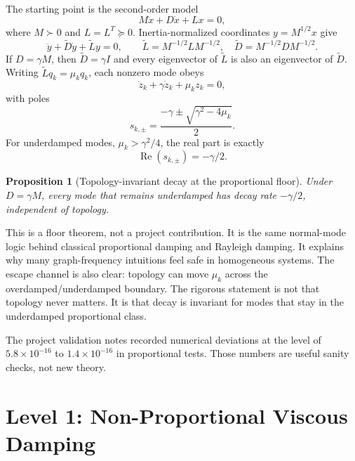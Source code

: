 \documentclass[11pt]{article}
\newcommand{\Real}{\operatorname{Re}}
\newcommand{\Lt}{\widetilde L}
\newcommand{\Dt}{\widetilde D}
\newtheorem{proposition}{Proposition}
\begin{document}
The starting point is the second-order model
\begin{equation}
  M\ddot x+D\dot x+Lx=0,
  \label{eq:level0-second-order}
\end{equation}
where $M\succ0$ and $L=L^T\succeq0$. Inertia-normalized coordinates
$y=M^{1/2}x$ give
\begin{equation}
  \ddot y+\Dt\dot y+\Lt y=0,\qquad
  \Lt=M^{-1/2}LM^{-1/2},\quad
  \Dt=M^{-1/2}DM^{-1/2}.
  \label{eq:normalized-coords}
\end{equation}
If $D=\gamma M$, then $\Dt=\gamma I$ and every eigenvector of $\Lt$ is also
an eigenvector of $\Dt$. Writing $\Lt q_k=\mu_kq_k$, each nonzero mode obeys
\begin{equation}
  \ddot z_k+\gamma\dot z_k+\mu_k z_k=0,
  \label{eq:level0-scalar}
\end{equation}
with poles
\begin{equation}
  s_{k,\pm}=\frac{-\gamma\pm\sqrt{\gamma^2-4\mu_k}}{2}.
  \label{eq:level0-poles}
\end{equation}
For underdamped modes, $\mu_k>\gamma^2/4$, the real part is exactly
\begin{equation}
  \Real(s_{k,\pm})=-\gamma/2.
  \label{eq:rigid-decay}
\end{equation}

\begin{proposition}[Topology-invariant decay at the proportional floor]
Under $D=\gamma M$, every mode that remains underdamped has decay rate
$-\gamma/2$, independent of topology.
\end{proposition}

\noindent This is a floor theorem, not a project contribution. It is the same
normal-mode logic behind classical proportional damping and Rayleigh damping.
It explains why many graph-frequency intuitions feel safe in homogeneous
systems. The escape channel is also clear: topology can move $\mu_k$ across
the overdamped/underdamped boundary. The rigorous statement is not that
topology never matters. It is that decay is invariant for modes that stay in
the underdamped proportional class.

The project validation notes recorded numerical deviations at the level of
$5.8\times10^{-16}$ to $1.4\times10^{-16}$ in proportional tests. Those numbers
are useful sanity checks, not new theory.

\section{Level 1: Non-Proportional Viscous Damping}
\end{document}
